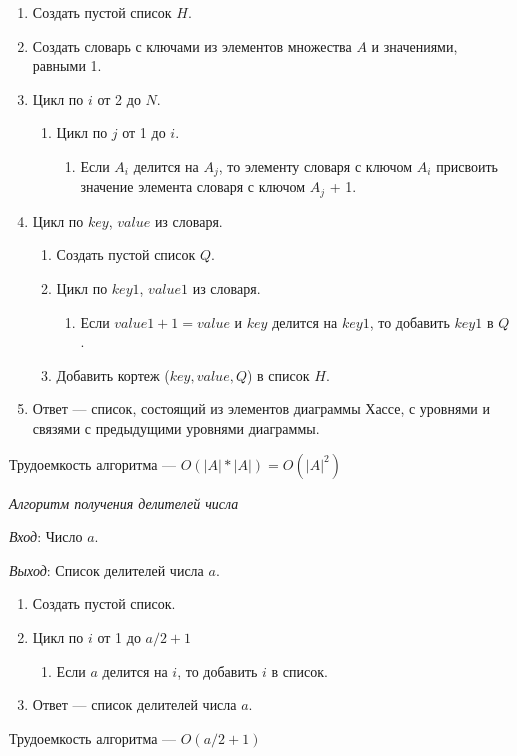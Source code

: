 \documentclass[bachelor, och, labwork]{shiza}
\begin{document}
\begin{enumerate}
    \item Создать пустой список $H$.
    \item Создать словарь с ключами из элементов множества $A$ и значениями, равными 1.
    \item Цикл по $i$ от 2 до $N$.
        \begin{enumerate}
            \item Цикл по $j$ от 1 до $i$.
                \begin{enumerate}
                    \item Если $A_i$ делится на $A_j$, то элементу словаря
                    с ключом $A_i$ присвоить значение элемента словаря с ключом
                    $A_j$ + 1.
                \end{enumerate}
        \end{enumerate}
    \item Цикл по $key$, $value$ из словаря.
        \begin{enumerate}
        \item Создать пустой список $Q$.
        \item  Цикл по $key1$, $value1$ из словаря.
            \begin{enumerate}
                \item Если $value1 + 1 = value$ и $key$ делится на $key1$, то
                добавить $key1$ в $Q$. 
            \end{enumerate}    
        \item Добавить кортеж ($key,value,Q$) в список $H$.
        \end{enumerate}
    \item Ответ --- список, состоящий из элементов диаграммы Хассе, с уровнями 
    и связями с предыдущими уровнями диаграммы.
\end{enumerate}
Трудоемкость алгоритма --- $O(|A| * |A|) = O(|A|^2)$

\begin{center}\textit{Алгоритм получения делителей числа}\end{center}

\textit{Вход}: Число $a$.

\textit{Выход}: Список делителей числа $a$.
\begin{enumerate}
    \item Создать пустой список.
    \item Цикл по $i$ от 1 до $a/2+1$
        \begin{enumerate}
            \item Если $a$ делится на $i$, то добавить $i$ в список.
        \end{enumerate}
    \item Ответ --- список делителей числа $a$.
\end{enumerate}
Трудоемкость алгоритма --- $O(a/2+1)$
\end{document}
